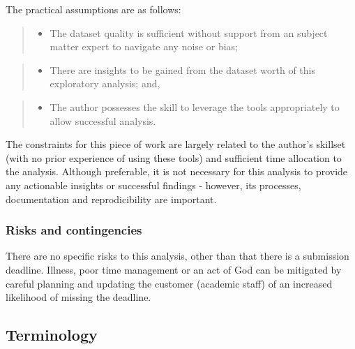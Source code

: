 \documentclass[
]{article}
\providecommand{\tightlist}{%
  \setlength{\itemsep}{0pt}\setlength{\parskip}{0pt}}
\begin{document}
The practical assumptions are as follows:

\begin{quote}
\begin{itemize}
\tightlist
\item
  The dataset quality is sufficient without support from an subject
  matter expert to navigate any noise or bias;
\end{itemize}
\end{quote}

\begin{quote}
\begin{itemize}
\tightlist
\item
  There are insights to be gained from the dataset worth of this
  exploratory analysis; and,
\end{itemize}
\end{quote}

\begin{quote}
\begin{itemize}
\tightlist
\item
  The author possesses the skill to leverage the tools appropriately to
  allow successful analysis.
\end{itemize}
\end{quote}

The constraints for this piece of work are largely related to the
author's skillset (with no prior experience of using these tools) and
sufficient time allocation to the analysis. Although preferable, it is
not necessary for this analysis to provide any actionable insights or
successful findings - however, its processes, documentation and
reprodicibility are important.

\hypertarget{risks-and-contingencies}{%
\subsubsection{Risks and contingencies}\label{risks-and-contingencies}}

There are no specific risks to this analysis, other than that there is a
submission deadline. Illness, poor time management or an act of God can
be mitigated by careful planning and updating the customer (academic
staff) of an increased likelihood of missing the deadline.

\hypertarget{terminology}{%
\subsection{Terminology}\label{terminology}}
\end{document}
